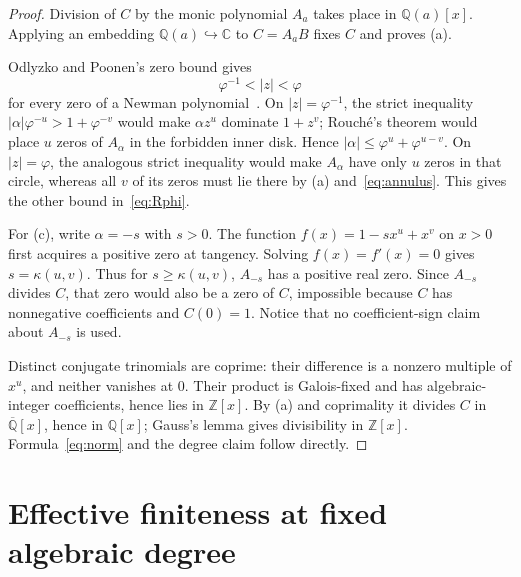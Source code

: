 \documentclass[11pt]{article}
\theoremstyle{remark}
\newcommand{\Q}{\mathbb Q}
\newcommand{\Z}{\mathbb Z}
\newcommand{\C}{\mathbb C}
\newcommand{\ph}{\varphi}
\numberwithin{equation}{section}
\begin{document}
\begin{proof}
Division of $C$ by the monic polynomial $A_a$ takes place in $\Q(a)[x]$.
Applying an embedding $\Q(a)\hookrightarrow\C$ to $C=A_aB$ fixes $C$ and
proves (a).

Odlyzko and Poonen's zero bound gives
\begin{equation}\label{eq:annulus}
 \ph^{-1}<|z|<\ph
\end{equation}
for every zero of a Newman polynomial~\cite{OP}.  On $|z|=\ph^{-1}$, the
strict inequality $|\alpha|\ph^{-u}>1+\ph^{-v}$ would make $\alpha z^u$
dominate $1+z^v$; Rouch\'e's theorem would place $u$ zeros of $A_\alpha$ in
the forbidden inner disk.  Hence $|\alpha|\le\ph^u+\ph^{u-v}$.  On
$|z|=\ph$, the analogous strict inequality would make $A_\alpha$ have only
$u$ zeros in that circle, whereas all $v$ of its zeros must lie there by (a)
and~\eqref{eq:annulus}.  This gives the other bound in~\eqref{eq:Rphi}.

For (c), write $\alpha=-s$ with $s>0$.  The function
$f(x)=1-sx^u+x^v$ on $x>0$ first acquires a positive zero at tangency.
Solving $f(x)=f'(x)=0$ gives $s=\kappa(u,v)$.  Thus for
$s\ge\kappa(u,v)$, $A_{-s}$ has a positive real zero.  Since $A_{-s}$ divides
$C$, that zero would also be a zero of $C$, impossible because $C$ has
nonnegative coefficients and $C(0)=1$.  Notice that no coefficient-sign claim
about $A_{-s}$ is used.

Distinct conjugate trinomials are coprime: their difference is a nonzero
multiple of $x^u$, and neither vanishes at $0$.  Their product is Galois-fixed
and has algebraic-integer coefficients, hence lies in $\Z[x]$.  By (a) and
coprimality it divides $C$ in $\overline{\Q}[x]$, hence in $\Q[x]$; Gauss's
lemma gives divisibility in $\Z[x]$.  Formula~\eqref{eq:norm} and the degree
claim follow directly.
\end{proof}

\section{Effective finiteness at fixed algebraic degree}
\end{document}
